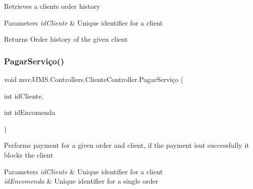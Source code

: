 Retrieves a client\textquotesingle{}s order history 


\begin{DoxyParams}{Parameters}
{\em id\+Cliente} & Unique identifier for a client\\
\hline
\end{DoxyParams}
\begin{DoxyReturn}{Returns}
Order history of the given client
\end{DoxyReturn}
\mbox{\label{classmvc_j_j_m_s_1_1_controllers_1_1_cliente_controller_ac3bcc6f76f48dfc5553f1686e2f44dd5}} 
\subsubsection{\texorpdfstring{Pagar\+Serviço()}{PagarServiço()}}
{\footnotesize\ttfamily void mvc\+J\+J\+M\+S.\+Controllers.\+Cliente\+Controller.\+Pagar\+Serviço (\begin{DoxyParamCaption}\item[{int}]{id\+Cliente,  }\item[{int}]{id\+Encomenda }\end{DoxyParamCaption})\hspace{0.3cm}{\ttfamily [inline]}}



Performs payment for a given order and client, if the payment isn\textquotesingle{}t successfully it blocks the client 


\begin{DoxyParams}{Parameters}
{\em id\+Cliente} & Unique identifier for a client\\
\hline
{\em id\+Encomenda} & Unique identifier for a single order\\
\hline
\end{DoxyParams}
\mbox{\label{classmvc_j_j_m_s_1_1_controllers_1_1_cliente_controller_a0027e8277cd9552a1122e12547ec10c6}} 
